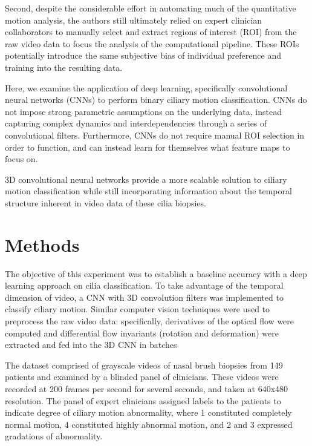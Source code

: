 Second, despite the considerable effort in automating much of the quantitative motion analysis, the authors still ultimately relied on expert clinician collaborators to manually select and extract regions of interest (ROI) from the raw video data to focus the analysis of the computational pipeline. These ROIs potentially introduce the same subjective bias of individual preference and training into the resulting data.

Here, we examine the application of deep learning, specifically convolutional neural networks (CNNs) to perform binary ciliary motion classification. CNNs do not impose strong parametric assumptions on the underlying data, instead capturing complex dynamics and interdependencies through a series of convolutional filters. Furthermore, CNNs do not require manual ROI selection in order to function, and can instead learn for themselves what feature maps to focus on.

3D convolutional neural networks provide a more scalable solution to ciliary motion classification while still incorporating information about the temporal structure inherent in video data of these cilia biopsies.

\section{Methods}

The objective of this experiment was to establish a baseline accuracy with a deep learning approach on cilia classification. To take advantage of the temporal dimension of video, a CNN with 3D convolution filters was implemented to classify ciliary motion. Similar computer vision techniques \cite{quinn2011novel} were used to preprocess the raw video data: specifically, derivatives of the optical flow were computed and differential flow invariants (rotation and deformation) were extracted and fed into the 3D CNN in batches

The dataset comprised of grayscale videos of nasal brush biopsies from 149 patients and examined by a blinded panel of clinicians. These videos were recorded at 200 frames per second for several seconds, and taken at 640x480 resolution. The panel of expert clinicians assigned labels to the patients to indicate degree of ciliary motion abnormality, where 1 constituted completely normal motion, 4 constituted highly abnormal motion, and 2 and 3 expressed gradations of abnormality. 

